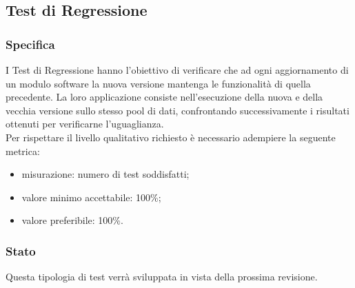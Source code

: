 \subsection{Test di Regressione}

	\subsubsection{Specifica}
		I Test di Regressione hanno l'obiettivo di verificare che ad ogni aggiornamento di un modulo software la nuova versione mantenga le funzionalità di quella precedente.
		La loro applicazione consiste nell'esecuzione della nuova e della vecchia versione sullo stesso pool di dati, confrontando successivamente i risultati ottenuti per verificarne l'uguaglianza.\\
		Per rispettare il livello qualitativo richiesto è necessario adempiere la seguente metrica:
		\begin{itemize}
			\item misurazione: numero di test soddisfatti;
			\item valore minimo accettabile: 100\%;
			\item valore preferibile: 100\%.
		\end{itemize}
	
	
	\subsubsection{Stato}
		Questa tipologia di test verrà sviluppata in vista della prossima revisione.